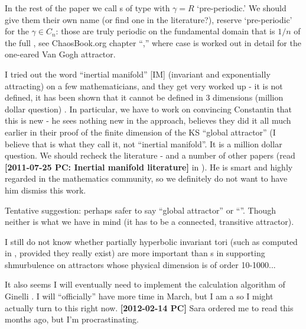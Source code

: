 \begin{description}
  In the rest of the paper we call \po s of type  with
  $\gamma=R$ `pre-periodic.' We should give them their own name (or find
  one in the literature?), reserve `pre-periodic' for the $\gamma\in C_n$:
  those are truly periodic on the fundamental domain that is $1/n$ of the
  full \statesp, see ChaosBook.org chapter
  ``,''
  where  case is worked out in detail for the one-eared Van Gogh
  attractor.

\item[2011-12-06, 2012-02-14 PC]
  I tried out the word ``inertial manifold'' [IM] (invariant and exponentially
  attracting) on a few mathematicians, and they get very worked up - it is
  not defined, it has been shown that it cannot be defined in 3 dimensions
  (million dollar question) \etc. In particular, we have to work on
  convincing Constantin that this is new - he sees nothing new in the
  {\cLvs} approach, believes they did it all much earlier in their
  proof of the finite dimension of the KS ``global attractor'' (I believe
  that is what they call it, not ``inertial manifold''. It is a million
  dollar question. We should recheck the literature -
   and a number of other
  papers (read {\bf [2011-07-25 PC: Inertial manifold literature]} in
  ). He is smart and highly regarded in the
  mathematics community, so we definitely do not want to have him dismiss
  this work.

  Tentative suggestion: perhaps safer to say ``global attractor'' or
  ``{\nws}''. Though neither is what we have in mind (it has to be a
  connected, transitive attractor).

\item[2012-02-14 PC] I still do not know whether partially hyperbolic
  invariant tori (such as computed in , provided they really exist)
  are more important than \rpo s in supporting shmurbulence on attractors whose
  physical dimension is of order 10-1000...

\item[2012-02-06 Evangelos]
  It also seems I will eventually need to implement the {\cLv}
  calculation algorithm of Ginelli \etal{}. I will
  ``officially'' have more time in March, but I am a
   so I might actually turn to this right now.
  {\bf [2012-02-14 PC]} Sara ordered me to read this months ago, but
  I'm procrastinating.


\end{description}
